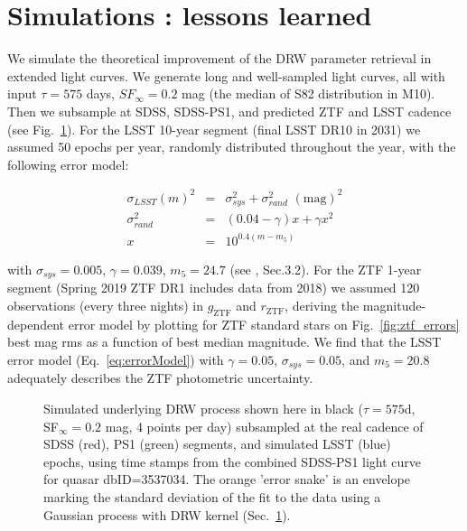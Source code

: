 \documentclass[twocolumn]{aastex62}
\begin{document}

%
%
%
%
%

\section{Simulations : lessons learned}\label{sec:simulation}

We simulate the theoretical improvement of the DRW parameter retrieval in extended light curves. We generate long and well-sampled light curves, all with input $\tau = 575 $ days, $SF_{\infty} = 0.2$ mag (the median of S82 distribution in M10). Then we subsample at SDSS, SDSS-PS1, and predicted ZTF and LSST cadence (see Fig.~\ref{fig:simLC}). For the LSST 10-year segment (final LSST DR10 in 2031) we assumed 50 epochs per year, randomly distributed throughout the year, with the following error model:

\begin{eqnarray}
\label{eq:errorModel}
\sigma_{LSST}(m)^{2} &=& \sigma_{sys}^{2} + \sigma_{rand}^{2} \,\, \mathrm{(mag)}^{2} \\
\sigma_{rand}^{2} &=& (0.04-\gamma)x + \gamma x^{2} \nonumber \\
x &=& 10^{0.4(m-m_{5})} \nonumber
\end{eqnarray}

with  $\sigma_{sys} = 0.005$, $\gamma=0.039$, $m_{5} = 24.7$ (see \citet{ivezic2019}, Sec.3.2).
For the ZTF 1-year segment (Spring 2019 ZTF DR1 includes data from 2018) we assumed 120 observations (every three nights) in $g_{\mathrm{ZTF}}$ and $r_{\mathrm{ZTF}}$, deriving the magnitude-dependent error model by plotting for ZTF standard stars on Fig.~\ref{fig:ztf_errors} best mag rms as a function of best median magnitude. We find that the LSST error model (Eq.~\ref{eq:errorModel}) with $\gamma = 0.05$, $\sigma_{sys} = 0.05 $, and $m_{5} = 20.8$ adequately describes the ZTF photometric uncertainty. 

\begin{figure}%
\caption{Simulated underlying DRW process shown here in black ($\tau=575$d, SF$_{\infty} = 0.2$ mag, 4 points per day) subsampled at the real cadence of SDSS (red), PS1 (green) segments, and simulated LSST (blue) epochs, using time stamps from the combined SDSS-PS1 light curve for quasar dbID=3537034. The orange 'error snake' is an envelope marking the standard deviation of the fit to the data using a Gaussian process  with DRW kernel (Sec.~\ref{sec:simulation}).}
\label{fig:simLC}
\end{figure} 
\end{document}
